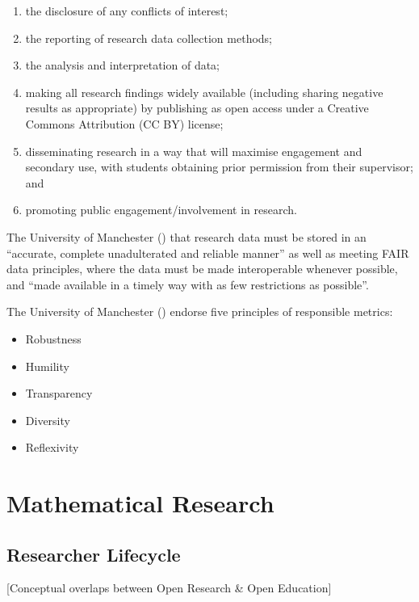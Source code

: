 \documentclass[
  british,
]{article}
\providecommand{\tightlist}{%
  \setlength{\itemsep}{0pt}\setlength{\parskip}{0pt}}
\begin{document}
\begin{enumerate}
\def\labelenumi{\arabic{enumi}.}
\tightlist
\item
  the disclosure of any conflicts of interest;
\item
  the reporting of research data collection methods;
\item
  the analysis and interpretation of data;
\item
  making all research findings widely available (including sharing
  negative results as appropriate) by publishing as open access under a
  Creative Commons Attribution (CC BY) license;
\item
  disseminating research in a way that will maximise engagement and
  secondary use, with students obtaining prior permission from their
  supervisor; and
\item
  promoting public engagement/involvement in research.
\end{enumerate}

The University of Manchester
() that research data must
be stored in an ``accurate, complete unadulterated and reliable manner''
as well as meeting FAIR data principles, where the data must be made
interoperable whenever possible, and ``made available in a timely way
with as few restrictions as possible''.

The University of Manchester ()
endorse five principles of responsible metrics:

\begin{itemize}
\tightlist
\item
  Robustness
\item
  Humility
\item
  Transparency
\item
  Diversity
\item
  Reflexivity
\end{itemize}

\section{Mathematical Research}\label{mathematical-research}

\subsection{Researcher Lifecycle}\label{researcher-lifecycle}

{[}Conceptual overlaps between Open Research \& Open Education{]}
\end{document}
